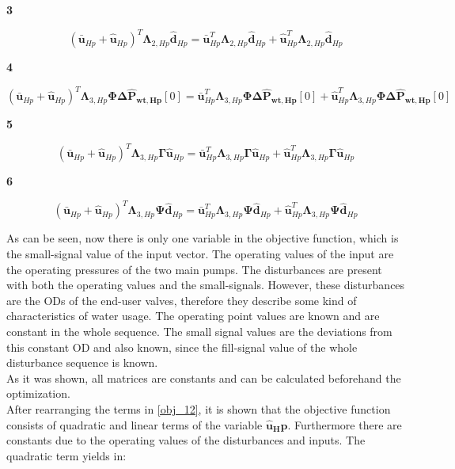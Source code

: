 \textbf{3}

\begin{equation}
 ({\bm{\bar{u}}}_{Hp} + {\bm{\hat{u}}}_{Hp})^{T} {\bm{\Lambda}}_{2,Hp} {\bm{\hat{d}}}_{Hp}  = {\bm{\bar{u}}}_{Hp}^{T} {\bm{\Lambda}}_{2,Hp} {\bm{\hat{d}}_{Hp}} 
 + {\bm{\hat{u}}}_{Hp}^{T} {\bm{\Lambda}}_{2,Hp} {\bm{\hat{d}}_{Hp}}  
\end{equation}

\textbf{4}

\begin{equation}
 ({\bm{\bar{u}}}_{Hp} + {\bm{\hat{u}}}_{Hp})^{T} {\bm{\Lambda}}_{3,Hp} \bm{\Phi} \bm{\Delta \hat{P}_{wt,Hp}}[0]   =  {\bm{\bar{u}}}_{Hp}^{T} {\bm{\Lambda}}_{3,Hp} \bm{\Phi} \bm{\Delta \hat{P}_{wt,Hp}}[0] + 
 {\bm{\hat{u}}}_{Hp}^{T} {\bm{\Lambda}}_{3,Hp} \bm{\Phi} \bm{\Delta \hat{P}_{wt,Hp}}[0]  
\end{equation}

\textbf{5}

\begin{equation}
 ({\bm{\bar{u}}}_{Hp} + {\bm{\hat{u}}}_{Hp})^{T} {\bm{\Lambda}}_{3,Hp} \bm{\Gamma} \bm{\hat{u}}_{Hp}   =  {\bm{\bar{u}}}_{Hp}^{T} {\bm{\Lambda}}_{3,Hp} {\bm{\Gamma}} \bm{\hat{u}}_{Hp} + 
 {\bm{\hat{u}}}_{Hp}^{T} {\bm{\Lambda}}_{3,Hp} \bm{\Gamma} \bm{\hat{u}}_{Hp} 
\end{equation}

\textbf{6}

\begin{equation}
 ({\bm{\bar{u}}}_{Hp} + {\bm{\hat{u}}}_{Hp})^{T} {\bm{\Lambda}}_{3,Hp} \bm{\Psi} \bm{\hat{d}}_{Hp}   =  {\bm{\bar{u}}}_{Hp}^{T} {\bm{\Lambda}}_{3,Hp} {\bm{\Psi}} \bm{\hat{d}}_{Hp} + 
 {\bm{\hat{u}}}_{Hp}^{T} {\bm{\Lambda}}_{3,Hp} \bm{\Psi} \bm{\hat{d}}_{Hp} 
 \label{obj_12}
\end{equation}

As can be seen, now there is only one variable in the objective function, which is the small-signal value of the input vector. The operating values of the input are the operating pressures of the two main pumps. The disturbances are present with both the operating values and the small-signals. However, these disturbances are the ODs of the end-user valves, therefore they describe some kind of characteristics of water usage. The operating point values are known and are constant in the whole sequence. The small signal values are the deviations from this constant OD and also known, since the fill-signal value of the whole disturbance sequence is known.
\\
As it was shown, all matrices are constants and can be calculated beforehand the optimization. 
\\
After rearranging the terms in \eqref{obj_12}, it is shown that the objective function consists of quadratic and linear terms of the variable $\bm{\hat{u}_Hp}$. Furthermore there are constants due to the operating values of the disturbances and inputs. The quadratic term yields in:

